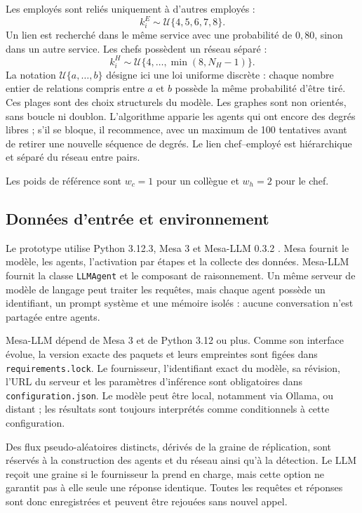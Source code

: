 \documentclass[10pt,a4paper]{article}
\newcommand{\code}[1]{\texttt{\small #1}}
\begin{document}
Les employés sont reliés uniquement à d’autres employés :
\[
k_i^E\sim\mathcal U\{4,5,6,7,8\}.
\]
Un lien est recherché dans le même service avec une probabilité de $0{,}80$,
sinon dans un autre service. Les chefs possèdent un réseau séparé :
\[
k_i^H\sim\mathcal U\{4,\ldots,\min(8,N_H-1)\}.
\]
La notation $\mathcal U\{a,\ldots,b\}$ désigne ici une loi uniforme discrète :
chaque nombre entier de relations compris entre $a$ et $b$ possède la même
probabilité d’être tiré. Ces plages sont des choix structurels du modèle.
Les graphes sont non orientés, sans boucle ni doublon. L’algorithme apparie les
agents qui ont encore des degrés libres ; s’il se bloque, il recommence, avec
un maximum de 100 tentatives avant de retirer une nouvelle séquence de degrés.
Le lien chef--employé est hiérarchique et séparé du réseau entre pairs.

Les poids de référence sont $w_c=1$ pour un collègue et $w_h=2$ pour le chef.

\subsection{Données d’entrée et environnement}

Le prototype utilise Python 3.12.3, Mesa 3 et Mesa-LLM 0.3.2
\cite{mesa2025,mesallm2026}. Mesa fournit le modèle, les agents, l’activation
par étapes et la collecte des données. Mesa-LLM fournit la classe
\code{LLMAgent} et le composant de raisonnement. Un même serveur de modèle de
langage peut traiter les requêtes, mais chaque agent possède un identifiant, un
prompt système et une mémoire isolés : aucune conversation n’est partagée entre
agents.

Mesa-LLM dépend de Mesa 3 et de Python 3.12 ou plus. Comme son interface évolue,
la version exacte des paquets et leurs empreintes sont figées dans
\code{requirements.lock}. Le fournisseur, l’identifiant exact du modèle, sa
révision, l’URL du serveur et les paramètres d’inférence sont obligatoires dans
\code{configuration.json}. Le modèle peut être local, notamment via Ollama, ou
distant ; les résultats sont toujours interprétés comme conditionnels à cette
configuration.

Des flux pseudo-aléatoires distincts, dérivés de la graine de réplication, sont
réservés à la construction des agents et du réseau ainsi qu’à la détection. Le
LLM reçoit une graine si le fournisseur la prend en charge, mais cette option ne
garantit pas à elle seule une réponse identique. Toutes les requêtes et
réponses sont donc enregistrées et peuvent être rejouées sans nouvel appel.
\end{document}
